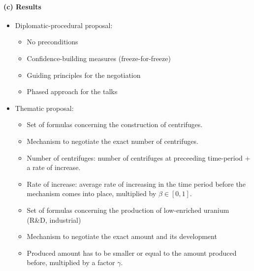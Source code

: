 \begin{minipage}{0.5\textwidth}
    \paragraph{(c) Results}
    \begin{itemize}
        \item Diplomatic-procedural proposal:
            \begin{itemize}
                \item No preconditions
                \item Confidence-building measures (freeze-for-freeze)
                \item Guiding principles for the negotiation
                \item Phased approach for the talks
            \end{itemize}
        \item Thematic proposal:
            \begin{itemize}
                \item Set of formulas concerning the construction of
                    centrifuges.
                \item Mechanism to negotiate the exact number of centrifuges.
                \item Number of centrifuges: number of centrifuges at preceeding
                    time-period + a rate of increase.
                \item Rate of increase: average rate of increasing in the time
                    period before the mechanism comes into place, multiplied by
                    $\beta \in [0,1]$.
                \item Set of formulas concerning the production of low-enriched
                    uranium (R\&D, industrial)
                \item Mechanism to negotiate the exact amount and its
                    development
                \item Produced amount has to be smaller or equal to the amount
                    produced before, multiplied by a factor $\gamma$.
            \end{itemize}
    \end{itemize}
\end{minipage} \hspace{10pt}

